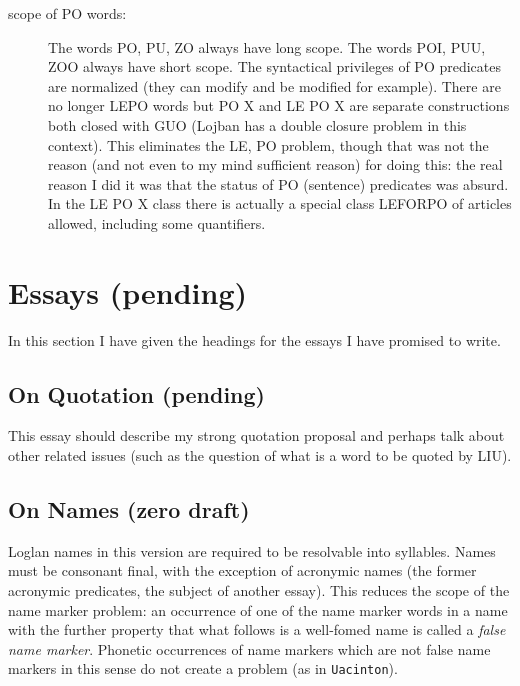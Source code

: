 \documentclass[12pt]{article}
\begin{document}
\begin{description}
\begin{description}
\item[scope of PO words:]   The words PO, PU, ZO always have long scope.   The words POI, PUU, ZOO always have short scope.   The syntactical privileges of PO
predicates are normalized (they can modify and be modified for example).   There are no longer LEPO words but PO X and LE PO X are separate constructions both closed
with GUO (Lojban has a double closure problem in this context).   This eliminates the LE, PO problem, though that was not the reason (and not even to my mind sufficient reason) for doing this:  the real reason I did it was that the status of PO (sentence) predicates was absurd.   In the LE PO X class there is actually a special class LEFORPO of articles allowed, including some quantifiers.

\end{description}

\end{description}

\section{Essays (pending)}

In this section I have given the headings for the essays I have promised to write.



\subsection{On Quotation (pending)}

This essay should describe my strong quotation proposal and perhaps talk about other related issues (such as the question of what is a word to be quoted by LIU).

\subsection{On Names (zero draft)}
Loglan names in this version are required to be resolvable into syllables.   Names must be consonant final, with the exception of acronymic names (the former acronymic predicates, the subject of another essay).   This reduces the scope of the name marker problem:  an occurrence of one of the name marker words in a name with the further property that what follows is a well-fomed name is called a {\em false name marker\/}.  Phonetic occurrences of name markers which are not false name markers in this sense do not create a problem (as in {\tt Uacinton}).
\end{document}
